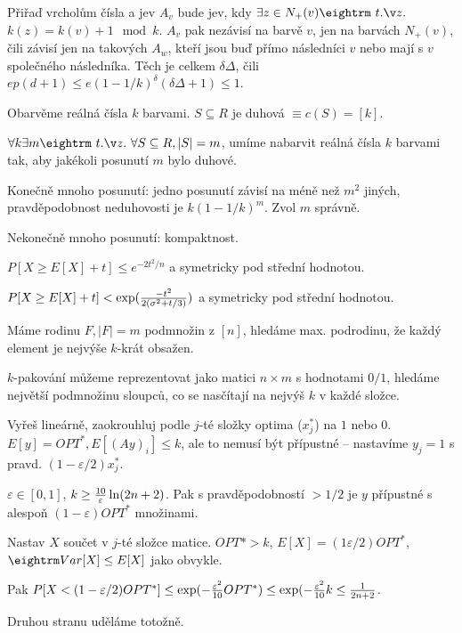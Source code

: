 \prf{} Přiřaď vrcholům čísla a jev $A_v$ bude jev, kdy $\exists z \in N_+(v) \st$ $k(z) = k(v) +1 \mod k$.
$A_v$ pak nezávisí na barvě $v$, jen na barvách $N_+(v)$, čili závisí jen na takových $A_w$, kteří jsou
buď přímo následníci $v$ nebo mají s $v$ společného následníka. Těch je celkem $\delta \Delta$, čili
$ep(d+1) \le e(1-1/k)^\delta (\delta \Delta + 1) \le 1$.

\dfn{} Obarvěme reálná čísla $k$ barvami. $S \subseteq R$ je {\I duhová} $\equiv c(S) = [k]$.

\thm{} $\forall k \exists m \st \forall S \subseteq R, |S|=m$, umíme nabarvit
reálná čísla $k$ barvami tak, aby jakékoli posunutí $m$ bylo duhové.

\prf{} Konečně mnoho posunutí: jedno posunutí závisí na méně než $m^2$ jiných, 
pravděpodobnost neduhovosti je $k(1-1/k)^m$. Zvol $m$ správně.

Nekonečně mnoho posunutí: kompaktnost.






 $P[X \ge E[X] + t] \le e^{-2t^2/n}$ a
symetricky pod střední hodnotou.

 $P[X \ge E[X] + t] < \exp({-t^2 \over
2(\sigma^2 + t/3)})$ a symetricky pod střední hodnotou.

 Máme rodinu $F, |F|=m$ podmnožin z $[n]$, hledáme max. podrodinu, že
každý element je nejvýše $k$-krát obsažen. 

$k$-pakování můžeme reprezentovat jako matici $n \times m$ s hodnotami $0/1$,
hledáme největší podmnožinu sloupců, co se nasčítají na nejvýš $k$ v každé
složce.

Vyřeš lineárně, zaokrouhluj podle $j$-té složky optima ($x^{*}_j$) na $1$ nebo $0$.
$E[y] = OPT^{*}, E[(Ay)_i] \le k$, ale to nemusí být přípustné -- nastavíme $y_j = 1$
s pravd. $(1 - \varepsilon/2) x^{*}_j$. 

\thm{} $\varepsilon \in [0,1]$, $k \ge {10 \over \varepsilon} \ln(2n+2)$. Pak s pravděpodobností
$> 1/2$ je $y$ přípustné s alespoň $(1-\varepsilon) OPT^*$ množinami.

\prf{} Nastav $X$ součet v $j$-té složce matice. $OPT* > k$, $E[X] = (1
\varepsilon/2) OPT^*$, $\var[X] \le E[X]$ jako obvykle.

Pak $P[X < (1 - \varepsilon/2)OPT^*] \le \exp(-{\varepsilon^2 \over 10} OPT^*)
\le \exp(-{\varepsilon^2 \over 10}k \le {1 \over 2n+2}$.

Druhou stranu uděláme totožně.

\bye
